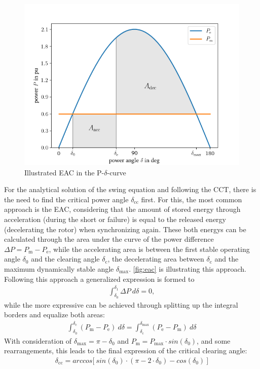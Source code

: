\begin{figure}
        \centering
        \includegraphics[width=.6\textwidth]{python/plots/eac.png}
        \caption{Illustrated \acf{EAC} in the P-$\delta$-curve}
        \label{fig:eac}
\end{figure}
For the analytical solution of the swing equation and following the \acs{CCT}, there is the need to find the critical power angle $\delta_\mathrm{cc}$ first. For this, the most common approach is the \acf{EAC}, considering that the amount of stored energy through acceleration (during the short or failure) is equal to the released energy (decelerating the rotor) when synchronizing again. These both energys can be calculated through the area under the curve of the power difference $\Delta P=P_\mathrm{m}-P_\mathrm{e}$, while the accelerating area is between the first stable operating angle $\delta_\mathrm{0}$ and the clearing angle $\delta_\mathrm{c}$, the decelerating area between $\delta_\mathrm{c}$ and the maximum dynamically stable angle $\delta_\mathrm{max}$. \autoref{fig:eac} is illustrating this approach. Following this approach a generalized expression is formed to
\begin{align}
        \int_{\delta_\mathrm{0}}^{\delta_\mathrm{1}}\Delta P~d\delta = 0 \label{eq:gen-eac},
\end{align}
while the more expressive can be achieved through splitting up the integral borders and equalize both areas:
\begin{align}
        \int_{\delta_\mathrm{0}}^{\delta_\mathrm{c}}(P_\mathrm{m}-P_\mathrm{e})~d\delta = \int_{\delta_\mathrm{c}}^{\delta_\mathrm{max}}(P_\mathrm{e}-P_\mathrm{m})~d\delta \label{eq:big-eac}
\end{align}
With consideration of $\delta_\mathrm{max}=\pi-\delta_\mathrm{0}$ and $P_\mathrm{m}=P_\mathrm{max} \cdot sin(\delta_\mathrm{0})$, and some rearrangements, this leads to the final expression of the critical clearing angle:
\begin{align}
        \delta_\mathrm{cc}=arccos\big[~sin(\delta_\mathrm{0}) \cdot (\pi-2 \cdot \delta_\mathrm{0})-cos(\delta_\mathrm{0})~\big] \label{eq:delta-cc}
\end{align}

